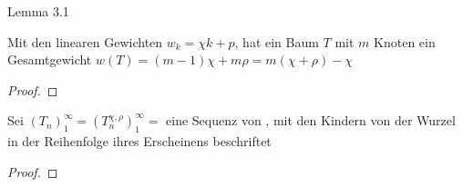 \begin{section}{Lemma 3.1}
\begin{theorem}
   Mit den linearen Gewichten $w_k = \chi k + p $, hat ein Baum $T$ mit $m$ Knoten ein Gesamtgewicht $w(T) = (m-1)\chi + m\rho = m(\chi + \rho) - \chi$
\end{theorem}
\begin{proof}
\end{proof}
\begin{theorem} \cite{janson2019random}
    Sei $(T_n)_1^\infty =(T_n^{\chi,\rho})_1^\infty = $ eine Sequenz von \linpreft, mit den Kindern von der Wurzel in der Reihenfolge ihres Erscheinens beschriftet
\end{theorem}
\begin{proof}
\end{proof}
\end{section}